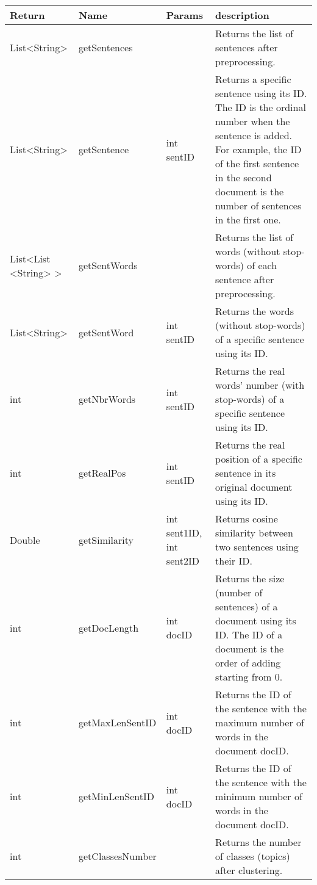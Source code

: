 \begin{tabular}{p{}p{}p{}p{}} 
	\hline \hline
	
	Return & Name & Params & description \\
	
	\hline\hline

	List<String> & getSentences &  & 
	Returns the list of sentences after preprocessing. \\
	\hline 
	
	List<String> & getSentence & int sentID & 
	Returns a specific sentence using its ID. The ID is the ordinal number when the sentence is added. For example, the ID of the first sentence in the second document is the number of sentences in the first one. \\
	\hline 
	
	List<List <String> > & getSentWords &  & 
	Returns the list of words (without stop-words) of each sentence after preprocessing. \\
	\hline
	
	List<String> & getSentWord & int sentID  & 
	Returns the words (without stop-words) of a specific sentence using its ID. \\
	\hline
	
	int & getNbrWords & int sentID  & 
	Returns the real words' number (with stop-words) of a specific sentence using its ID.  \\
	\hline
	
	
	int & getRealPos & int sentID  & 
	Returns the real position of a specific sentence in its original document using its ID.  \\
	\hline
	
	Double & getSimilarity & int sent1ID, int sent2ID  & 
	Returns cosine similarity between two sentences using their ID.  \\
	\hline
	
	int & getDocLength & int docID  & 
	Returns the size (number of sentences) of a document using its ID. The ID of a document is the order of adding starting from 0.  \\
	\hline
	
	int & getMaxLenSentID & int docID  & 
	Returns the ID of the sentence with the maximum number of words in the document docID.  \\
	\hline
	
	
	int & getMinLenSentID & int docID  & 
	Returns the ID of the sentence with the minimum number of words in the document docID.  \\
	\hline
	
	
	int & getClassesNumber &   & 
	Returns the number of classes (topics) after clustering.  \\
	
	\hline \hline
\end{tabular}